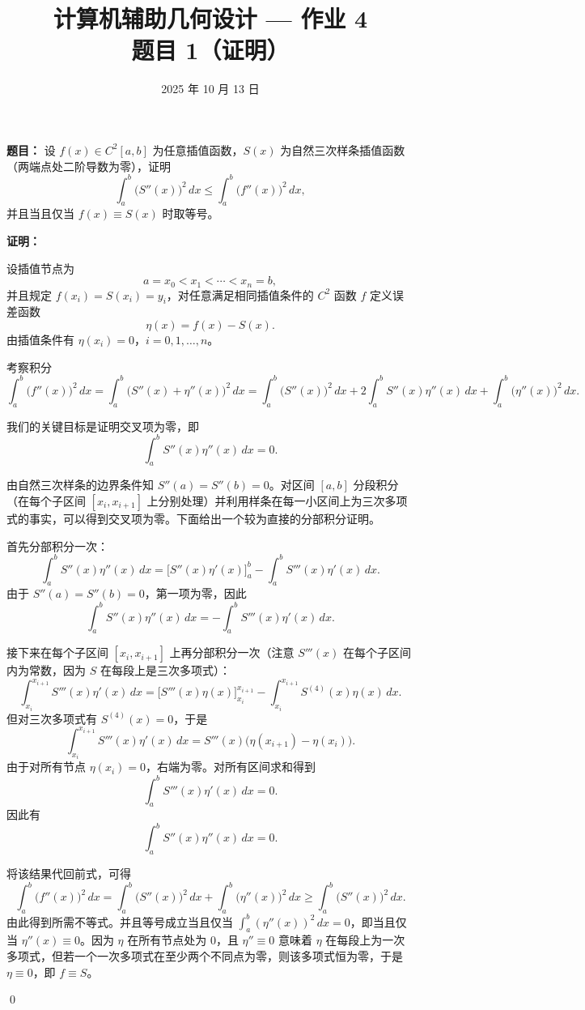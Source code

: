 \documentclass[12pt]{ctexart}
\title{计算机辅助几何设计 — 作业 4\\题目 1（证明）}
\author{}
\date{2025 年 10 月 13 日}
\begin{document}
\maketitle

\noindent\textbf{题目：} 设 $f(x)\in C^2[a,b]$ 为任意插值函数，$S(x)$ 为自然三次样条插值函数（两端点处二阶导数为零），证明
\[
\int_a^b \bigl(S''(x)\bigr)^2\,dx \le \int_a^b \bigl(f''(x)\bigr)^2\,dx,
\]
并且当且仅当 $f(x)\equiv S(x)$ 时取等号。

\bigskip

\noindent\textbf{证明：}

\noindent 设插值节点为
\[
a=x_0<x_1<\cdots<x_n=b,
\]
并且规定 $f(x_i)=S(x_i)=y_i$，对任意满足相同插值条件的 $C^2$ 函数 $f$ 定义误差函数
\[
\eta(x)=f(x)-S(x).
\]
由插值条件有 $\eta(x_i)=0$，$i=0,1,\dots,n$。

\medskip

\noindent 考察积分
\[
\int_a^b \bigl(f''(x)\bigr)^2\,dx
= \int_a^b \bigl(S''(x)+\eta''(x)\bigr)^2\,dx
= \int_a^b \bigl(S''(x)\bigr)^2\,dx
  + 2\int_a^b S''(x)\eta''(x)\,dx
  + \int_a^b \bigl(\eta''(x)\bigr)^2\,dx.
\]

\noindent 我们的关键目标是证明交叉项为零，即
\[
\int_a^b S''(x)\eta''(x)\,dx = 0.
\]

\noindent 由自然三次样条的边界条件知 $S''(a)=S''(b)=0$。对区间 $[a,b]$ 分段积分（在每个子区间 $[x_i,x_{i+1}]$ 上分别处理）并利用样条在每一小区间上为三次多项式的事实，可以得到交叉项为零。下面给出一个较为直接的分部积分证明。

\medskip

\noindent 首先分部积分一次：
\[
\int_a^b S''(x)\eta''(x)\,dx
= \bigl[S''(x)\eta'(x)\bigr]_a^b - \int_a^b S'''(x)\eta'(x)\,dx.
\]
由于 $S''(a)=S''(b)=0$，第一项为零，因此
\[
\int_a^b S''(x)\eta''(x)\,dx = -\int_a^b S'''(x)\eta'(x)\,dx.
\]

\noindent 接下来在每个子区间 $[x_i,x_{i+1}]$ 上再分部积分一次（注意 $S'''(x)$ 在每个子区间内为常数，因为 $S$ 在每段上是三次多项式）：
\[
\int_{x_i}^{x_{i+1}} S'''(x)\eta'(x)\,dx
= \bigl[S'''(x)\eta(x)\bigr]_{x_i}^{x_{i+1}} - \int_{x_i}^{x_{i+1}} S^{(4)}(x)\eta(x)\,dx.
\]
但对三次多项式有 $S^{(4)}(x)=0$，于是
\[
\int_{x_i}^{x_{i+1}} S'''(x)\eta'(x)\,dx = S'''(x)\bigl(\eta(x_{i+1})-\eta(x_i)\bigr).
\]
由于对所有节点 $\eta(x_i)=0$，右端为零。对所有区间求和得到
\[
\int_a^b S'''(x)\eta'(x)\,dx = 0.
\]
因此有
\[
\int_a^b S''(x)\eta''(x)\,dx = 0.
\]

\medskip

\noindent 将该结果代回前式，可得
\[
\int_a^b \bigl(f''(x)\bigr)^2\,dx
= \int_a^b \bigl(S''(x)\bigr)^2\,dx + \int_a^b \bigl(\eta''(x)\bigr)^2\,dx
\ge \int_a^b \bigl(S''(x)\bigr)^2\,dx.
\]
由此得到所需不等式。并且等号成立当且仅当 $\int_a^b (\eta''(x))^2\,dx=0$，即当且仅当 $\eta''(x)\equiv 0$。因为 $\eta$ 在所有节点处为 0，且 $\eta''\equiv 0$ 意味着 $\eta$ 在每段上为一次多项式，但若一个一次多项式在至少两个不同点为零，则该多项式恒为零，于是 $\eta\equiv 0$，即 $f\equiv S$。

\qed
\end{document}

